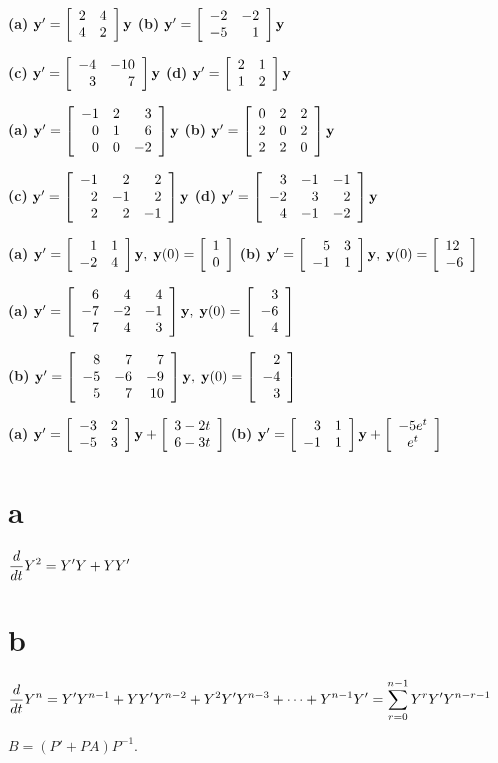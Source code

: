 \medskip

{\bf (a)} ${\bf y}'=\twobytwo2442{\bf y}$\;
\qquad
{\bf (b)} ${\bf
y}'=\twobytwo{-2}{-2}{-5}1{\bf y}$

\quad\;
{\bf (c)} ${\bf y}'=\twobytwo{-4}{-10}37{\bf y}$\;
{\bf (d)} ${\bf
y}'=\twobytwo2112{\bf y}$

{\bf (a)} ${\bf y}'=\threebythree{-1}2301600{-2}{\bf y}$
\quad
{\bf (b)} ${\bf
y}'=\threebythree022202220{\bf y}$

\quad\;
{\bf (c)} ${\bf y}'=\threebythree{-1}222{-1}222{-1}{\bf y}$
\quad
{\bf (d)}
${\bf y}'=\threebythree3{-1}{-1}{-2}324{-1}{-2}{\bf y}$

{\bf (a)} ${\bf y}'=\twobytwo11{-2}4{\bf y},\;{\bf y}(0)=\twocol10$
\quad
{\bf (b)} ${\bf y}'=\twobytwo53{-1}1{\bf y},\;{\bf y}(0)=\twocol{12}{-6}$

{\bf (a)} ${\bf y}'=\threebythree644{-7}{-2}{-1}743{\bf y},\;{\bf y}(0)
=\threecol3{-6}4$

\quad\;
{\bf (b)} ${\bf y}'=\threebythree877{-5}{-6}{-9}57{10}{\bf y},\;{\bf
y}(0)=\threecol2{-4}3$

{\bf (a)} ${\bf y}'=\twobytwo{-3}2{-5}3{\bf
y}+\twocol{3-2t}{6-3t}$
\quad
{\bf (b)} ${\bf y}'=\twobytwo31{-1}1{\bf
y}+\left[\begin{array}{c}-5e^{t}\\e^{t}\end{array}\right]$

\part{a}\;  $\dst\frac{d}{dt}Y^{2}=Y'Y+YY'$

\quad\;  \;
\part{b}\;
$\dst\frac{d}{dt}Y^{n}=
Y'Y^{n-1}+YY'Y^{n-2}+Y^{2}Y'Y^{n-3}+\cdots+Y^{n-1}Y'=
\sum_{r=0}^{n-1}
Y^{r}Y'Y^{n-r-1}$

$B=(P'+PA)P^{-1}$.

